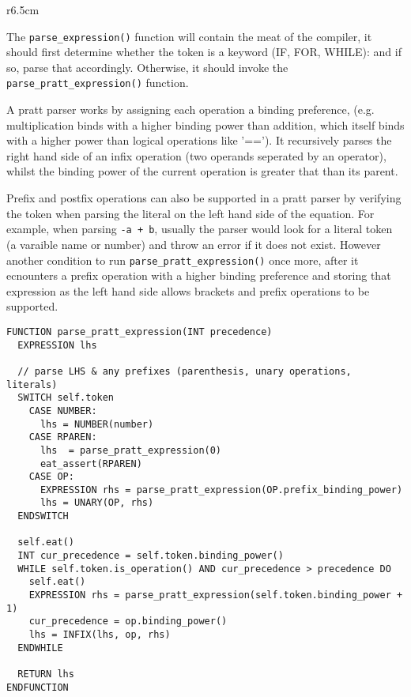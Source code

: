 \begin{wrapfigure}[24]{r}{6.5cm}
\end{wrapfigure}

The \texttt{parse\_expression()} function will contain the meat of the compiler, it should first determine whether the token is a keyword (IF, FOR, WHILE): and if so, parse that accordingly. Otherwise, it should invoke the \texttt{parse\_pratt\_expression()} function. 

A pratt parser works by assigning each operation a binding preference, (e.g. multiplication binds with a higher binding power than addition, which itself binds with a higher power than logical operations like '=='). It recursively parses the right hand side of an infix operation (two operands seperated by an operator), whilst the binding power of the current operation is greater that than its parent. 

Prefix and postfix operations can also be supported in a pratt parser by verifying the token when parsing the literal on the left hand side of the equation. For example, when parsing \texttt{-a + b}, usually the parser would look for a literal token (a varaible name or number) and throw an error if it does not exist. However another condition to run \texttt{parse\_pratt\_expression()} once more, after it ecnounters a prefix operation with a higher binding preference and storing that expression as the left hand side allows brackets and prefix operations to be supported.

\begin{lstlisting}
FUNCTION parse_pratt_expression(INT precedence)
  EXPRESSION lhs

  // parse LHS & any prefixes (parenthesis, unary operations, literals)
  SWITCH self.token 
    CASE NUMBER:
      lhs = NUMBER(number)
    CASE RPAREN:
      lhs  = parse_pratt_expression(0)
      eat_assert(RPAREN)
    CASE OP:
      EXPRESSION rhs = parse_pratt_expression(OP.prefix_binding_power)
      lhs = UNARY(OP, rhs)
  ENDSWITCH

  self.eat()
  INT cur_precedence = self.token.binding_power()
  WHILE self.token.is_operation() AND cur_precedence > precedence DO 
    self.eat()
    EXPRESSION rhs = parse_pratt_expression(self.token.binding_power + 1)
    cur_precedence = op.binding_power()
    lhs = INFIX(lhs, op, rhs)
  ENDWHILE

  RETURN lhs
ENDFUNCTION
\end{lstlisting}

